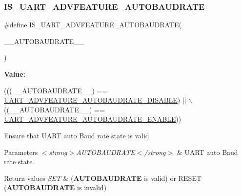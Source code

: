 \subsubsection{\texorpdfstring{I\+S\+\_\+\+U\+A\+R\+T\+\_\+\+A\+D\+V\+F\+E\+A\+T\+U\+R\+E\+\_\+\+A\+U\+T\+O\+B\+A\+U\+D\+R\+A\+TE}{IS\_UART\_ADVFEATURE\_AUTOBAUDRATE}}
{\footnotesize\ttfamily \#define I\+S\+\_\+\+U\+A\+R\+T\+\_\+\+A\+D\+V\+F\+E\+A\+T\+U\+R\+E\+\_\+\+A\+U\+T\+O\+B\+A\+U\+D\+R\+A\+TE(\begin{DoxyParamCaption}\item[{}]{\+\_\+\+\_\+\+A\+U\+T\+O\+B\+A\+U\+D\+R\+A\+T\+E\+\_\+\+\_\+ }\end{DoxyParamCaption})}

{\bfseries Value\+:}
\begin{DoxyCode}
(((\_\_AUTOBAUDRATE\_\_) == \hyperlink{group___u_a_r_t___auto_baud_rate___enable_gaca66b20599569c6b7576f0600050bb61}{UART\_ADVFEATURE\_AUTOBAUDRATE\_DISABLE}) || \(\backslash\)
                                                            ((\_\_AUTOBAUDRATE\_\_) == 
      \hyperlink{group___u_a_r_t___auto_baud_rate___enable_gad4eee70c6d23721dd95c6a2465e10ca4}{UART\_ADVFEATURE\_AUTOBAUDRATE\_ENABLE}))
\end{DoxyCode}


Ensure that U\+A\+RT auto Baud rate state is valid. 


\begin{DoxyParams}{Parameters}
{\em $<$strong$>$\+A\+U\+T\+O\+B\+A\+U\+D\+R\+A\+T\+E$<$/strong$>$} & U\+A\+RT auto Baud rate state. \\
\hline
\end{DoxyParams}

\begin{DoxyRetVals}{Return values}
{\em S\+ET} & ({\bfseries A\+U\+T\+O\+B\+A\+U\+D\+R\+A\+TE} is valid) or R\+E\+S\+ET ({\bfseries A\+U\+T\+O\+B\+A\+U\+D\+R\+A\+TE} is invalid) \\
\hline
\end{DoxyRetVals}
\mbox{\label{group___u_a_r_t___private___macros_ga8f6cd85ae5ce7f8dd0ed9227ef5154f6}} 
